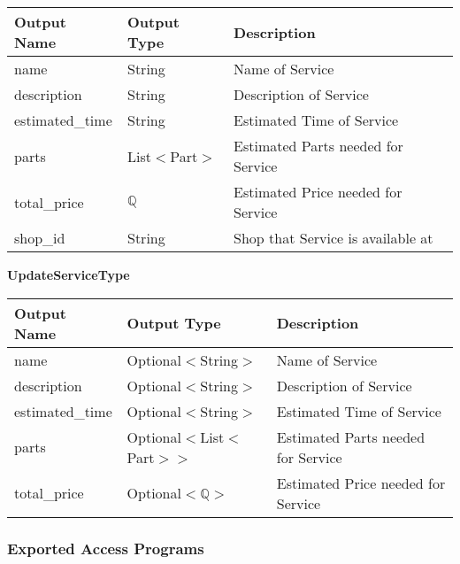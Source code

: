 \documentclass[12pt, titlepage]{article}
\begin{document}
\begin{table}[H]
	\begin{tabular}{|l|l|l|}
		\hline
		\textbf{Output Name} & \textbf{Output Type} & \textbf{Description}               \\
		\hline
		name                 & String               & Name of Service                    \\
		\hline
		description          & String               & Description of Service             \\
		\hline
		estimated\_time      & String               & Estimated Time of Service          \\
		\hline
		parts                & List$<$Part$>$       & Estimated Parts needed for Service \\
		\hline
		total\_price         & $\mathbb{Q}$         & Estimated Price needed for Service \\
		\hline
		shop\_id             & String               & Shop that Service is available at  \\
		\hline
	\end{tabular}
\end{table}

\textbf{UpdateServiceType}

\begin{table}[H]
	\begin{tabular}{|l|l|l|}
		\hline
		\textbf{Output Name} & \textbf{Output Type}       & \textbf{Description}               \\
		\hline
		name                 & Optional$<$String$>$       & Name of Service                    \\
		\hline
		description          & Optional$<$String$>$       & Description of Service             \\
		\hline
		estimated\_time      & Optional$<$String$>$       & Estimated Time of Service          \\
		\hline
		parts                & Optional$<$List$<$Part$>>$ & Estimated Parts needed for Service \\
		\hline
		total\_price         & Optional$<\mathbb{Q}>$     & Estimated Price needed for Service \\
		\hline
	\end{tabular}
\end{table}

\subsubsection{Exported Access Programs}
\end{document}
